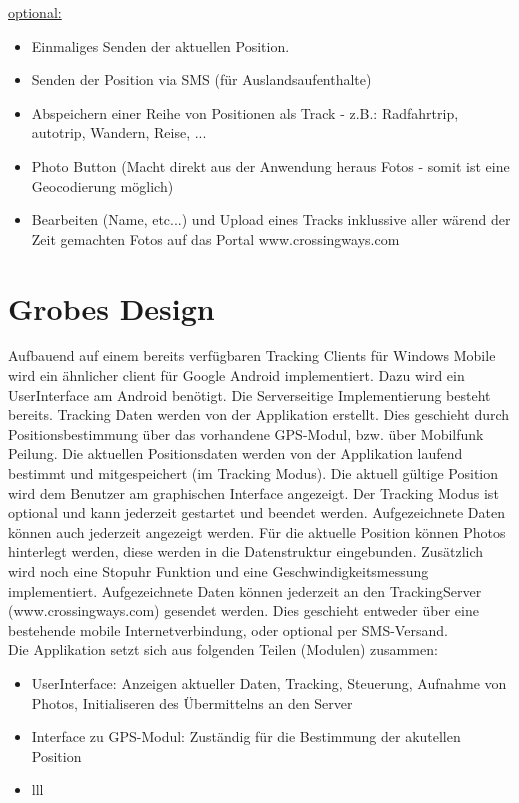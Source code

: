 \documentclass[a4paper,10pt]{article}
\begin{document}
\underline{optional:}
\begin{itemize}
\item Einmaliges Senden der aktuellen Position.
\item Senden der Position via SMS (für Auslandsaufenthalte)
\item Abspeichern einer Reihe von Positionen als Track - z.B.: Radfahrtrip, autotrip, Wandern, Reise, ...
\item Photo Button (Macht direkt aus der Anwendung heraus Fotos - somit ist eine Geocodierung möglich)
\item Bearbeiten (Name, etc...) und Upload eines Tracks inklussive aller  wärend der Zeit gemachten Fotos auf das Portal www.crossingways.com
\end{itemize}

\section{Grobes Design}
Aufbauend auf einem bereits verfügbaren Tracking Clients für Windows Mobile wird ein ähnlicher client für
Google Android implementiert. Dazu wird ein UserInterface am Android benötigt. Die Serverseitige Implementierung
besteht bereits. Tracking Daten werden von der Applikation erstellt. Dies geschieht durch Positionsbestimmung über
das vorhandene GPS-Modul, bzw. über Mobilfunk Peilung. Die aktuellen Positionsdaten werden von der Applikation laufend
bestimmt und mitgespeichert (im Tracking Modus). Die aktuell gültige Position wird dem Benutzer am graphischen Interface
angezeigt. Der Tracking Modus ist optional und kann jederzeit gestartet und beendet werden. Aufgezeichnete Daten können auch
jederzeit angezeigt werden. Für die aktuelle Position können Photos hinterlegt werden, diese werden in die Datenstruktur
eingebunden. Zusätzlich wird noch eine Stopuhr Funktion und eine Geschwindigkeitsmessung implementiert. Aufgezeichnete
Daten können jederzeit an den TrackingServer (www.crossingways.com) gesendet werden. Dies geschieht entweder über eine
bestehende mobile Internetverbindung, oder optional per SMS-Versand.\\
Die Applikation setzt sich aus folgenden Teilen (Modulen) zusammen:
\begin{itemize}
 \item UserInterface: Anzeigen aktueller Daten, Tracking, Steuerung, Aufnahme von Photos, Initialiseren des Übermittelns
an den Server
 \item Interface zu GPS-Modul: Zuständig für die Bestimmung der akutellen Position
 \item lll
\end{itemize}
\end{document}

